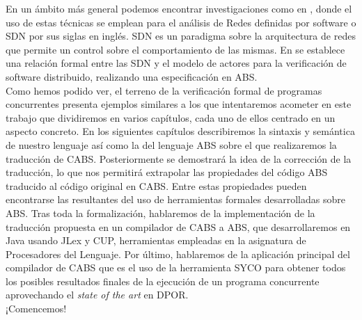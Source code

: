En un ámbito más general podemos encontrar investigaciones como en \cite{costa1}, donde el uso de estas técnicas se emplean para el análisis de Redes definidas por software o SDN por sus siglas en inglés. SDN es un paradigma sobre la arquitectura de redes que permite un control sobre el comportamiento de las mismas. En \cite{costa1} se establece una relación formal entre las SDN y el modelo de actores para la verificación de software distribuido, realizando una especificación en ABS.\\

Como hemos podido ver, el terreno de la verificación formal de programas concurrentes presenta ejemplos similares a los que intentaremos acometer en este trabajo que dividiremos en varios capítulos, cada uno de ellos centrado en un aspecto concreto. En los siguientes capítulos describiremos la sintaxis y semántica de nuestro lenguaje así como la del lenguaje ABS sobre el que realizaremos la traducción de CABS. Posteriormente se demostrará la idea de la corrección de la traducción, lo que nos permitirá extrapolar las propiedades del código ABS traducido al código original en CABS. Entre estas propiedades pueden encontrarse las resultantes del uso de herramientas formales desarrolladas sobre ABS. Tras toda la formalización, hablaremos de la implementación de la traducción propuesta en un compilador de CABS a ABS, que desarrollaremos en Java usando JLex y CUP, herramientas empleadas en la asignatura de Procesadores del Lenguaje. Por último, hablaremos de la aplicación principal del compilador de CABS que es el uso de la herramienta SYCO para obtener todos los posibles resultados finales de la ejecución de un programa concurrente aprovechando el \emph{state of the art} en DPOR.\\

¡Comencemos!
